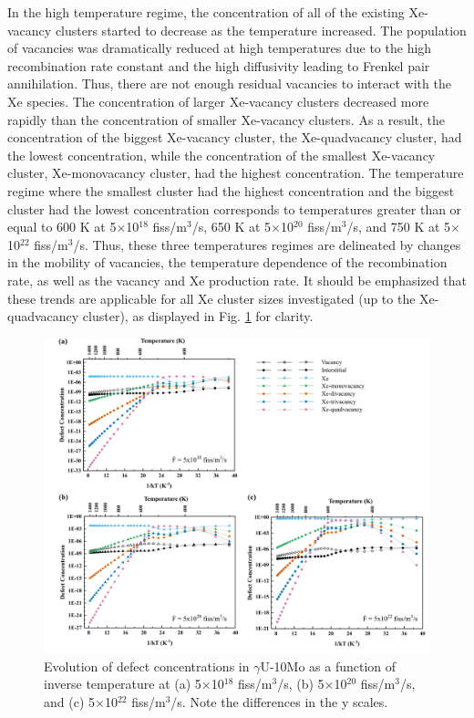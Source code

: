 \documentclass[preprint,12pt]{elsarticle}
\begin{document}
In the high temperature regime, the concentration of all of the existing Xe-vacancy clusters started to decrease as the temperature increased. The population of vacancies was dramatically reduced at high temperatures due to the high recombination rate constant and the high diffusivity leading to Frenkel pair annihilation. Thus, there are not enough residual vacancies to interact with the Xe species. The concentration of larger Xe-vacancy clusters decreased more rapidly than the concentration of smaller Xe-vacancy clusters. As a result, the concentration of the biggest Xe-vacancy cluster, the Xe-quadvacancy cluster, had the lowest concentration, while the concentration of the smallest Xe-vacancy cluster, Xe-monovacancy cluster, had the highest concentration. The temperature regime where the smallest cluster had the highest concentration and the biggest cluster had the lowest concentration corresponds to temperatures greater than or equal to 600 K at 5$\times$10$^{18}$ fiss/m$^{3}$/s, 650 K at 5$\times$10$^{20}$ fiss/m$^{3}$/s, and 750 K at 5$\times$10$^{22}$ fiss/m$^{3}$/s. Thus, these three temperatures regimes are delineated by changes in the mobility of vacancies, the temperature dependence of the recombination rate, as well as the vacancy and Xe production rate. It should be emphasized that these trends are applicable for all Xe cluster sizes investigated (up to the Xe-quadvacancy cluster), as displayed in Fig. \ref{fig:Xecon} for clarity. \\

\begin{figure}[hbt!]
\centering
\includegraphics[width=1\textwidth]{Fig8.png}
\caption{Evolution of defect concentrations in $\gamma$U-10Mo as a function of inverse temperature at (a) 5$\times$10$^{18}$ fiss/m$^{3}$/s, (b) 5$\times$10$^{20}$ fiss/m$^{3}$/s, and (c) 5$\times$10$^{22}$ fiss/m$^{3}$/s. Note the differences in the y scales.}
\label{fig:Xecon}
\end{figure}
\end{document}
